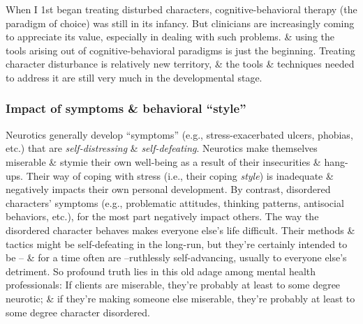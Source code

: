 \documentclass{article}
\numberwithin{equation}{section}
\begin{document}
When I 1st began treating disturbed characters, cognitive-behavioral therapy (the paradigm of choice) was still in its infancy. But clinicians are increasingly coming to appreciate its value, especially in dealing with such problems. \& using the tools arising out of cognitive-behavioral paradigms is just the beginning. Treating character disturbance is relatively new territory, \& the tools \& techniques needed to address it are still very much in the developmental stage.

\subsubsection{Impact of symptoms \& behavioral ``style''}
Neurotics generally develop ``symptoms'' (e.g., stress-exacerbated ulcers, phobias, etc.) that are \textit{self-distressing} \& \textit{self-defeating}. Neurotics make themselves miserable \& stymie their own well-being as a result of their insecurities \& hang-ups. Their way of coping with stress (i.e., their coping \textit{style}) is inadequate \& negatively impacts their own personal development. By contrast, disordered characters' symptoms (e.g., problematic attitudes, thinking patterns, antisocial behaviors, etc.), for the most part negatively impact others. The way the disordered character behaves makes everyone else's life difficult. Their methods \& tactics might be self-defeating in the long-run, but they're certainly intended to be -- \& for a time often are --ruthlessly self-advancing, usually to everyone else's detriment. So profound truth lies in this old adage among mental health professionals: If clients are miserable, they're probably at least to some degree neurotic; \& if they're making someone else miserable, they're probably at least to some degree character disordered.
\end{document}
